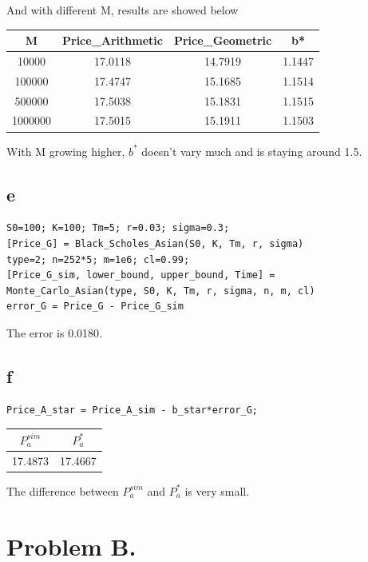 \documentclass{article}
\begin{document}
And with different M, results are showed below

\begin{table}[h]
\begin{tabular}{|c|c|c|c|}

\hline
M & Price\_Arithmetic & Price\_Geometric & b* \\
\hline
10000 & 17.0118 & 14.7919 & 1.1447  \\
\hline
100000 & 17.4747 & 15.1685 & 1.1514  \\
\hline
500000 & 17.5038 & 15.1831 & 1.1515  \\
\hline
1000000 & 17.5015 & 15.1911 & 1.1503  \\
\hline

\end{tabular}
\end{table}
With M growing higher, ${b^*}$ doesn't vary much and is staying around 1.5.

\subsection{e}
\begin{verbatim}
S0=100; K=100; Tm=5; r=0.03; sigma=0.3;
[Price_G] = Black_Scholes_Asian(S0, K, Tm, r, sigma)
type=2; n=252*5; m=1e6; cl=0.99;
[Price_G_sim, lower_bound, upper_bound, Time] = Monte_Carlo_Asian(type, S0, K, Tm, r, sigma, n, m, cl)
error_G = Price_G - Price_G_sim
\end{verbatim}
The error is 0.0180.

\subsection{f}

\begin{verbatim}
Price_A_star = Price_A_sim - b_star*error_G;
\end{verbatim}

\begin{table}[h]
\begin{tabular}{|c|c|}

\hline
$P_a^{sim}$ & $P_a^*$  \\
\hline
17.4873 &  17.4667  \\
\hline

\end{tabular}
\end{table}

The difference between $P_a^{sim}$ and $P_a^*$ is very small. 

\section{Problem B.}
\end{document}
